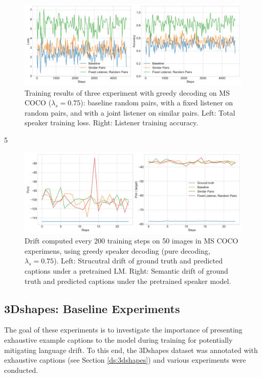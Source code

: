 \begin{figure}
	\centering
	\includegraphics[width=\linewidth]{images/coco_greedy_all_075_losses.png}
	\caption{Training results of three experiment with greedy decoding on MS COCO ($\lambda_s = 0.75$): baseline random pairs, with a fixed listener on random pairs, and with a joint listener on similar pairs. Left: Total speaker training loss. Right: Listener training accuracy.}
	\label{fig:coco_greedy_baseline}
\end{figure} 
5
\begin{figure}
	\centering
	\includegraphics[width=\linewidth]{images/coco_structural_semantic_drift_greedy_all_4000_pure_075.png}
	\caption{Drift computed every 200 training steps on 50 images in MS COCO experimens, using greedy speaker decoding (pure decoding, $\lambda_s = 0.75$). Left: Strucutral drift of ground truth and predicted captions under a pretrained LM. Right: Semantic drift of ground truth and predicted captions under the pretrained speaker model.}
	\label{fig:coco_greedy_drifts}
\end{figure} 

\subsection{3Dshapes: Baseline Experiments}
\label{expt:3dshapes_baseline}

The goal of these experiments is to investigate the importance of presenting exhaustive example captions to the model during training for potentially mitigating language drift. To this end, the 3Dshapes dataset was annotated with exhaustive captions (see Section \ref{ds:3dshapes}) and various experiments were conducted. %

